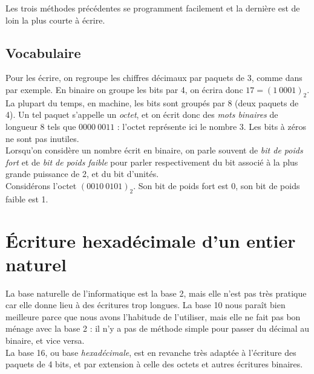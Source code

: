 Les trois méthodes précédentes se programment facilement et la dernière est de loin la plus courte à écrire.

\subsection{Vocabulaire}

\medskip\par
Pour les écrire, on regroupe les chiffres décimaux par paquets de 3, comme dans  par exemple.
En binaire on groupe les bits par 4, on écrira donc $17=\left(1\ 0001\right)_2$.\\
La plupart du temps, en machine, les bits sont groupés par 8 (deux paquets de 4). Un tel paquet s'appelle un \textit{octet}, et on écrit donc des \textit{mots binaires} de longueur 8 tels que $0000\ 0011$ : l'octet représente ici le nombre 3. Les bits à zéros ne sont pas inutiles.\\

Lorsqu'on considère un nombre écrit en binaire, on parle souvent de \textit{bit de poids fort} et de
\textit{bit de poids faible} pour parler respectivement du bit associé à la plus grande puissance de 2, et du bit
d'unités.\\
Considérons l'octet $(0010\ 0101)_2$. Son bit de poids fort est 0, son bit de poids faible est 1.

\section{\'Ecriture hexadécimale d'un entier naturel}

La base \og naturelle \fg{} de l'informatique est la base 2, mais elle n'est pas très pratique car elle donne lieu à
des écritures trop longues.
La base 10 nous paraît bien meilleure parce que nous avons l'habitude de l'utiliser, mais elle ne fait pas bon ménage
avec la base 2 : il n'y a pas de méthode simple pour passer du décimal au binaire, et vice versa.\\
La base 16, ou base \textit{hexadécimale}, est en revanche très adaptée à l'écriture des paquets de 4 bits, et par
extension à celle des octets et autres écritures binaires.\\

